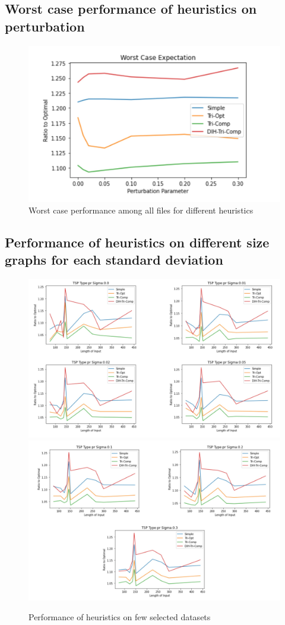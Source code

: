 \subsection{Worst case performance of heuristics on perturbation}
\begin{figure}[H]
    \centering
    \includegraphics[scale=0.26]{8.jpg}
    \caption{Worst case performance among all files for different heuristics}
\end{figure}

\subsection{Performance of heuristics on different size graphs for each standard deviation}
\begin{figure}[H]
    \centering
    \includegraphics[scale=0.21]{9.jpg}
    \includegraphics[scale=0.21]{10.jpg}
    \caption{Performance of heuristics on few selected datasets}
\end{figure}